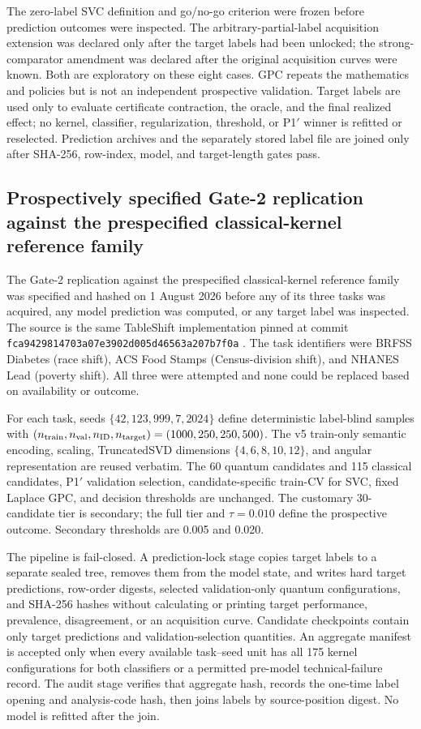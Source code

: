 \documentclass[referee,lineno,pdflatex,sn-nature]{sn-jnl}
\theoremstyle{thmstyleone}%
\theoremstyle{thmstyletwo}%
\theoremstyle{thmstylethree}%
\begin{document}
The zero-label SVC definition and go/no-go criterion were frozen before prediction outcomes were inspected. The arbitrary-partial-label acquisition extension was declared only after the target labels had been unlocked; the strong-comparator amendment was declared after the original acquisition curves were known. Both are exploratory on these eight cases. GPC repeats the mathematics and policies but is not an independent prospective validation. Target labels are used only to evaluate certificate contraction, the oracle, and the final realized effect; no kernel, classifier, regularization, threshold, or P1$'$ winner is refitted or reselected. Prediction archives and the separately stored label file are joined only after SHA-256, row-index, model, and target-length gates pass.

\subsection{Prospectively specified Gate-2 replication against the prespecified classical-kernel reference family}
\label{sec:methods_gate2_prospective}

The Gate-2 replication against the prespecified classical-kernel reference family was specified and hashed on 1 August 2026 before any of its three tasks was acquired, any model prediction was computed, or any target label was inspected. The source is the same TableShift implementation pinned at commit \texttt{fca9429814703a07e3902d005d46563a207b7f0a} \cite{gardner2023tableshift}. The task identifiers were BRFSS Diabetes (race shift), ACS Food Stamps (Census-division shift), and NHANES Lead (poverty shift). All three were attempted and none could be replaced based on availability or outcome.

For each task, seeds $\{42,123,999,7,2024\}$ define deterministic label-blind samples with $(n_{\rm train},n_{\rm val},n_{\rm ID},n_{\rm target})=(1000,250,250,500)$. The v5 train-only semantic encoding, scaling, TruncatedSVD dimensions $\{4,6,8,10,12\}$, and angular representation are reused verbatim. The 60 quantum candidates and 115 classical candidates, P1$'$ validation selection, candidate-specific train-CV for SVC, fixed Laplace GPC, and decision thresholds are unchanged. The customary 30-candidate tier is secondary; the full tier and $\tau=0.010$ define the prospective outcome. Secondary thresholds are 0.005 and 0.020.

The pipeline is fail-closed. A prediction-lock stage copies target labels to a separate sealed tree, removes them from the model state, and writes hard target predictions, row-order digests, selected validation-only quantum configurations, and SHA-256 hashes without calculating or printing target performance, prevalence, disagreement, or an acquisition curve. Candidate checkpoints contain only target predictions and validation-selection quantities. An aggregate manifest is accepted only when every available task--seed unit has all 175 kernel configurations for both classifiers or a permitted pre-model technical-failure record. The audit stage verifies that aggregate hash, records the one-time label opening and analysis-code hash, then joins labels by source-position digest. No model is refitted after the join.
\end{document}
